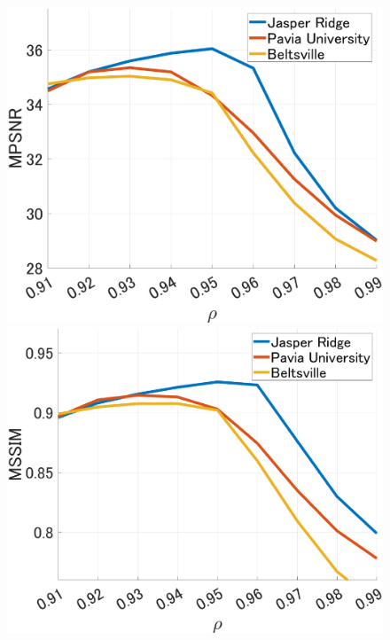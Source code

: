 \begin{figure}[t]
\begin{center}
\begin{minipage}{0.240\hsize}
        \end{minipage}
        \begin{minipage}{0.240\hsize}
            \centerline{\includegraphics[width=\hsize]{./fig_Param_Anal/rho_mpsnr.eps}}
        \end{minipage}
        \begin{minipage}{0.240\hsize}
            \centerline{\includegraphics[width=\hsize]{./fig_Param_Anal/rho_mssim.eps}}
        \end{minipage}


\end{center}
\end{figure}
